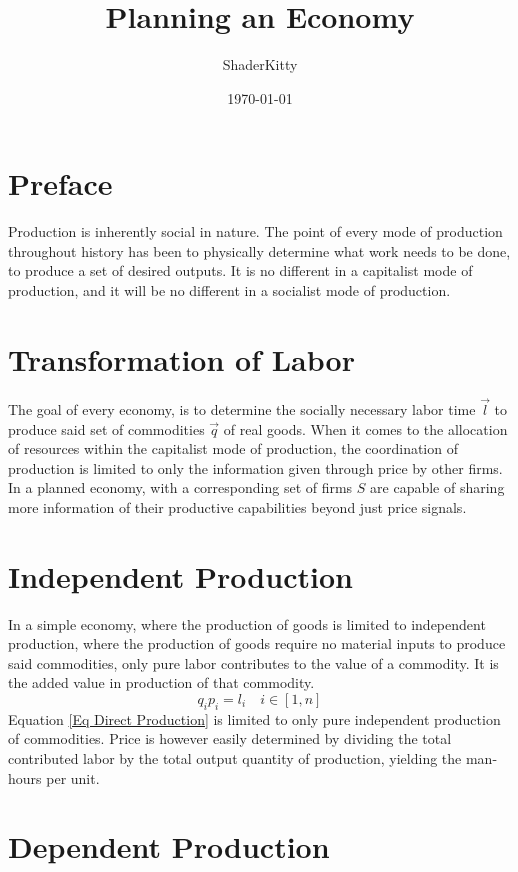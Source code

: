 \documentclass{book}
\title{Planning an Economy}
\author{ShaderKitty}
\date{\today}
\begin{document}
\maketitle

\tableofcontents

\frontmatter
\chapter{Preface}

Production is inherently social in nature. The point of every mode of production throughout history has been to physically determine what work needs to be done, to produce a set of desired outputs. It is no different in a capitalist mode of production, and it will be no different in a socialist mode of production.
\chapter{Transformation of Labor}
The goal of every economy, is to determine the socially necessary labor time $\vec{l}$ to produce said set of commodities $\vec{q}$ of real goods. When it comes to the allocation of resources within the capitalist mode of production, the coordination of production is limited to only the information given through price by other firms. In a planned economy, with a corresponding set of firms $S$ are capable of sharing more information of their productive capabilities beyond just price signals.
\chapter{Independent Production}
In a simple economy, where the production of goods is limited to independent production, where the production of goods require no material inputs to produce said commodities, only pure labor contributes to the value of a commodity. It is the added value in production of that commodity.
\begin{equation}
	\label{Eq Direct Production}
	q_{i} p_{i} = l_{i} \quad i \in [1, n]
\end{equation}
Equation \ref{Eq Direct Production} is limited to only pure independent production of commodities. Price is however easily determined by dividing the total contributed labor by the total output quantity of production, yielding the man-hours per unit.
\chapter{Dependent Production}
\end{document}
